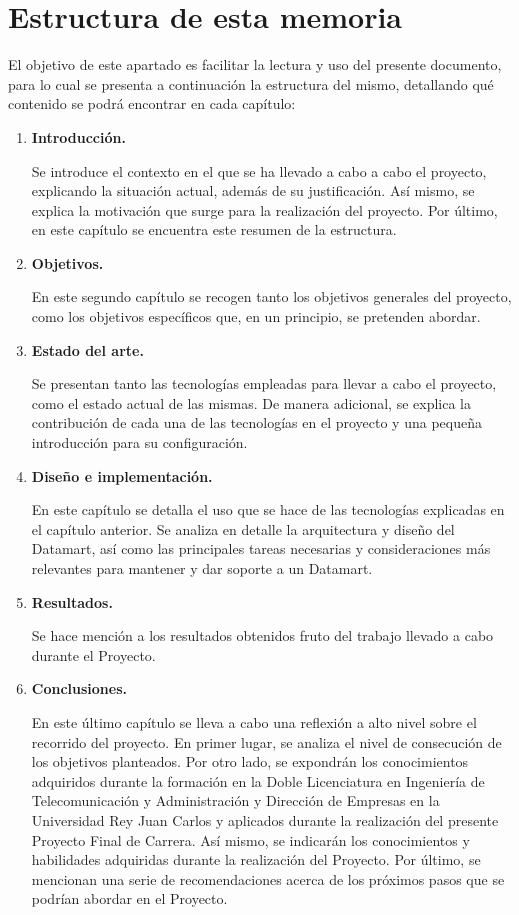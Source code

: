 \documentclass[a4paper, 12pt]{book}
\begin{document}
\section{Estructura de esta memoria}
\label{sec:estructura}
El objetivo de este apartado es facilitar la lectura y uso del presente documento, para lo cual se presenta a continuación la estructura del mismo, detallando qué contenido se podrá encontrar en cada capítulo:

\begin{enumerate}
	\item \textbf{Introducción.}\par
	Se introduce el contexto en el que se ha llevado a cabo a cabo el proyecto, explicando la situación actual, además de su justificación. Así mismo, se explica la motivación que surge para la realización del proyecto. Por último, en este capítulo se encuentra este resumen de la estructura. 
	
	\item \textbf{Objetivos.}\par
	En este segundo capítulo se recogen tanto los objetivos generales del proyecto, como los objetivos específicos que, en un principio, se pretenden abordar.
	
	\item \textbf{Estado del arte.}\par
	Se presentan tanto las tecnologías empleadas para llevar a cabo el proyecto, como el estado actual de las mismas. De manera adicional, se explica la contribución de cada una de las tecnologías en el proyecto y una pequeña introducción para su configuración.
		
	\item \textbf{Diseño e implementación.}\par
	En este capítulo se detalla el uso que se hace de las tecnologías explicadas en el capítulo anterior. Se analiza en detalle la arquitectura y diseño del Datamart, así como las principales tareas necesarias y consideraciones más relevantes para mantener y dar soporte a un Datamart.
	
	\item \textbf{Resultados.}\par
	Se hace mención a los resultados obtenidos fruto del trabajo llevado a cabo durante el Proyecto.
	
	\item \textbf{Conclusiones.}\par
	En este último capítulo se lleva a cabo una reflexión a alto nivel sobre el recorrido del proyecto. En primer lugar, se analiza el nivel de consecución de los objetivos planteados. Por otro lado, se expondrán los conocimientos adquiridos durante la formación en la Doble Licenciatura en Ingeniería de Telecomunicación y Administración y Dirección de Empresas en la Universidad Rey Juan Carlos y aplicados durante la realización del presente Proyecto Final de Carrera. Así mismo, se indicarán los conocimientos y habilidades adquiridas durante la realización del Proyecto. Por último, se mencionan una serie de recomendaciones acerca de los próximos pasos que se podrían abordar en el Proyecto.
	
\end{enumerate}
\end{document}
